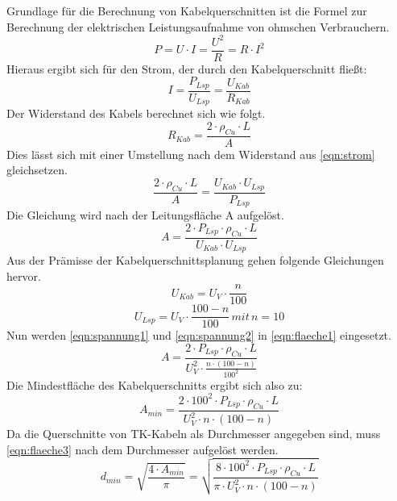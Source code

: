 Grundlage für die Berechnung von Kabelquerschnitten ist die Formel zur Berechnung der elektrischen Leistungsaufnahme von ohmschen Verbrauchern.
\begin{equation}
P=U\cdot I = \frac{U^2}{R} = R\cdot I^2
\label{eqn:leistung}
\end{equation}
Hieraus ergibt sich für den Strom, der durch den Kabelquerschnitt fließt:
\begin{equation}
I = \frac{P_{Lsp}}{U_{Lsp}} = \frac{U_{Kab}}{R_{Kab}}
\label{eqn:strom}
\end{equation}
Der Widerstand des Kabels berechnet sich wie folgt.
\begin{equation}
R_{Kab} = \frac{2\cdot\rho_{Cu}\cdot L}{A}
\label{eqn:widerstand}
\end{equation}
Dies lässt sich mit einer Umstellung nach dem Widerstand aus \ref{eqn:strom} gleichsetzen.
\begin{equation}
\frac{2\cdot\rho_{Cu}\cdot L}{A} = \frac{U_{Kab}\cdot U_{Lsp}}{P_{Lsp}}
\label{eqn:gleichsetzung1}
\end{equation}
Die Gleichung wird nach der Leitungsfläche A aufgelöst.
\begin{equation}
A = \frac{2\cdot P_{Lsp}\cdot \rho_{Cu}\cdot L}{U_{Kab}\cdot U_{Lsp}}
\label{eqn:flaeche1}
\end{equation}
Aus der Prämisse der Kabelquerschnittsplanung gehen folgende Gleichungen hervor.
\begin{equation}
U_{Kab} = U_V\cdot\frac{n}{100}
\label{eqn:spannung1}
\end{equation}
\begin{equation}
U_{Lsp} = U_V\cdot\frac{100-n}{100}\,mit \,n = 10
\label{eqn:spannung2}
\end{equation}
Nun werden \ref{eqn:spannung1} und \ref{eqn:spannung2} in \ref{eqn:flaeche1} eingesetzt.
\begin{equation}
A = \frac{2\cdot P_{Lsp}\cdot \rho_{Cu}\cdot L}{U_V^2\cdot\frac{n\cdot(100-n)}{100^2}}
\label{eqn:flaeche2}
\end{equation}
Die Mindestfläche des Kabelquerschnitts ergibt sich also zu:
\begin{equation}
A_{min} = \frac{2\cdot 100^2\cdot P_{Lsp}\cdot \rho_{Cu}\cdot L}{U_V^2\cdot n\cdot (100-n)}
\label{eqn:flaeche3}
\end{equation}
Da die Querschnitte von TK-Kabeln als Durchmesser angegeben sind, muss \ref{eqn:flaeche3} nach dem Durchmesser aufgelöst werden.
\begin{equation}
d_{min} = \sqrt{\frac{4\cdot A_{min}}{\pi}} = \sqrt{\frac{8\cdot 100^2\cdot P_{Lsp}\cdot \rho_{Cu}\cdot L}{\pi\cdot U_V^2\cdot n\cdot (100-n)}}
\label{eqn:durchmesser}
\end{equation}

